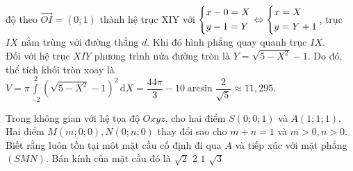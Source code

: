 \begin{ex}
{{}
		\noindent độ theo $\overrightarrow{OI}=(0;1)$ thành hệ trục XIY với $\left\{\begin{aligned}&x-0=X\\&y-1=Y\end{aligned}\right. \Leftrightarrow \left\{\begin{aligned}&x=X\\&y=Y+1\end{aligned}\right.$, trục $IX$ nằm trùng với đường thẳng $d$. Khi đó hình phẳng quay quanh trục $IX$.\\
		Đối với hệ trục $XIY$ phương trình nửa đường tròn là $Y=\sqrt{5-X^2}-1$. Do đó, thể tích khối tròn xoay là $V=\pi \displaystyle\int\limits_{-2}^2 \left(\sqrt{5-X^2}-1 \right)^2 \mathrm{\,d}X =\dfrac{44\pi}{3}-10\arcsin \dfrac{2}{\sqrt{5}} \approx 11{,}295.$
	}
\end{ex}

\begin{ex}%
	Trong không gian với hệ tọa độ $Oxyz$, cho hai điểm $S(0;0;1)$ và $A(1;1;1)$. Hai điểm $M(m;0;0), N(0;n;0)$ thay đổi sao cho $m+n=1$ và $m>0,n>0$. Biết rằng luôn tồn tại một mặt cầu cố định đi qua $A$ và tiếp xúc với mặt phẳng $(SMN)$. Bán kính của mặt cầu đó là
	\choice
	{$\sqrt{2}$}
	{$2$}
	{\True $1$}
	{$\sqrt{3}$}
\end{ex}

